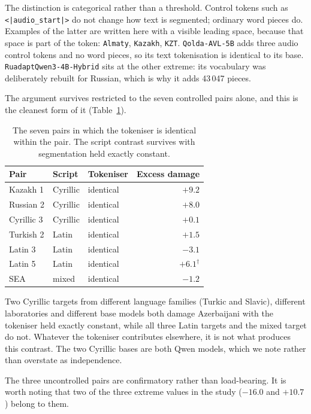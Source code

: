 \documentclass[final]{clv2025}
\begin{document}
The distinction is categorical rather than a threshold. Control tokens such as
\texttt{<|audio\_start|>} do not change how text is segmented; ordinary word
pieces do. Examples of the latter are written here with a visible leading
space, because that space is part of the token:
\texttt{\textvisiblespace Almaty}, \texttt{\textvisiblespace Kazakh},
\texttt{\textvisiblespace KZT}.
\texttt{Qolda-AVL-5B} adds three audio control tokens and no word pieces, so
its text tokenisation is identical to its base.
\texttt{RuadaptQwen3-4B-Hybrid} sits at the other extreme: its vocabulary was
deliberately rebuilt for Russian, which is why it adds 43\,047 pieces.

The argument survives restricted to the seven controlled pairs alone, and this
is the cleanest form of it (Table~\ref{tab:controlled}).

\begin{table}[h!]
\caption{The seven pairs in which the tokeniser is identical within the pair. The
script contrast survives with segmentation held exactly constant.}
\label{tab:controlled}
\centering
\begin{tabular}{lllr}
\toprule
Pair & Script & Tokeniser & Excess damage \\
\midrule
Kazakh 1 & Cyrillic & identical & $\mathbf{+9.2}$ \\
Russian 2 & Cyrillic & identical & $\mathbf{+8.0}$ \\
Cyrillic 3 & Cyrillic & identical & $+0.1$ \\
Turkish 2 & Latin & identical & $+1.5$ \\
Latin 3 & Latin & identical & $-3.1$ \\
Latin 5 & Latin & identical & $+6.1^{\dagger}$ \\
SEA & mixed & identical & $-1.2$ \\
\bottomrule
\end{tabular}
\end{table}

Two Cyrillic targets from different language families (Turkic and Slavic),
different laboratories and different base models both damage Azerbaijani with
the tokeniser held exactly constant, while all three Latin targets and the
mixed target do not. Whatever the tokeniser contributes elsewhere, it is not what
produces this contrast. The two Cyrillic bases are both Qwen models, which we
note rather than overstate as independence.

The three uncontrolled pairs are confirmatory rather than load-bearing. It is
worth noting that two of the three extreme values in the study ($-16.0$ and
$+10.7$) belong to them.
\end{document}
